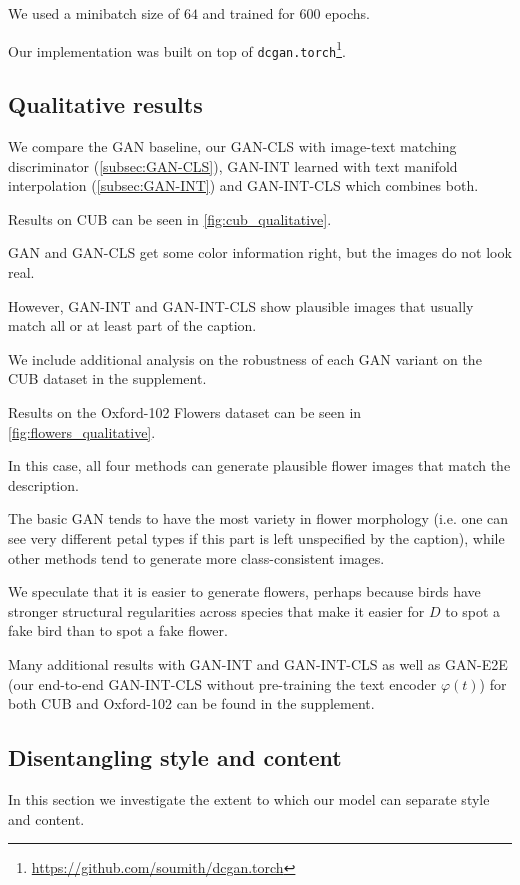 We used a minibatch size of $64$ and trained for $600$ epochs.

Our implementation was built on top of \texttt{dcgan.torch}\footnote{\url{https://github.com/soumith/dcgan.torch}}.

\subsection{Qualitative results}

We compare the GAN baseline, our GAN-CLS with image-text matching discriminator (\autoref{subsec:GAN-CLS}), GAN-INT learned with text manifold interpolation (\autoref{subsec:GAN-INT}) and GAN-INT-CLS which combines both.

Results on CUB can be seen in \autoref{fig:cub_qualitative}.

GAN and GAN-CLS get some color information right, but the images do not look real.

However, GAN-INT and GAN-INT-CLS show plausible images that usually match all or at least part of the caption. 

We include additional analysis on the robustness of each GAN variant on the CUB dataset in the supplement.

Results on the Oxford-102 Flowers dataset can be seen in \autoref{fig:flowers_qualitative}.

In this case, all four methods can generate plausible flower images that match the description.

The basic GAN tends to have the most variety in flower morphology (i.e. one can see very different petal types if this part is left unspecified by the caption), while other methods tend to generate more class-consistent images.

We speculate that it is easier to generate flowers, perhaps because birds have stronger structural regularities across species that make it easier for $D$ to spot a fake bird than to spot a fake flower.

Many additional results with GAN-INT and GAN-INT-CLS as well as GAN-E2E (our end-to-end GAN-INT-CLS without pre-training the text encoder $\varphi(t)$) for both CUB and Oxford-102 can be found in the supplement.

\subsection{Disentangling style and content}

In this section we investigate the extent to which our model can separate style and content.

